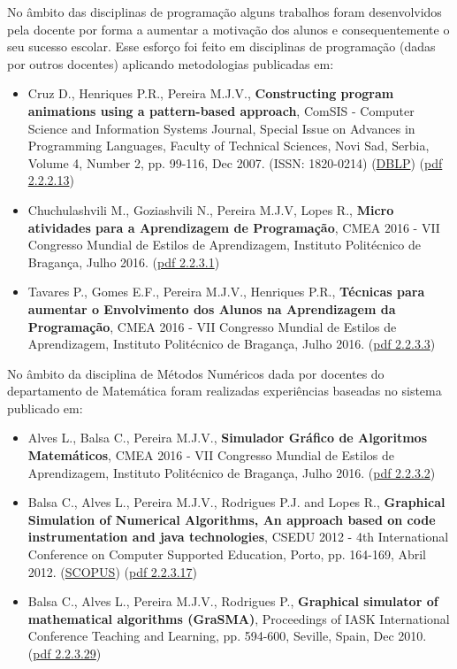 \documentclass[11pt]{article}
\begin{document}
No âmbito das disciplinas de programação alguns trabalhos foram desenvolvidos pela docente por forma a aumentar a motivação dos alunos e consequentemente o seu sucesso escolar. Esse esforço foi feito em disciplinas de programação (dadas por outros docentes) aplicando metodologias publicadas em:
\begin{itemize}
\item {Cruz D., Henriques P.R., Pereira M.J.V., {\bf{ Constructing program animations using a pattern-based approach}}, ComSIS - Computer Science and Information Systems Journal, Special Issue on Advances in Programming Languages, Faculty of Technical Sciences, Novi Sad, Serbia, Volume 4, Number 2, pp. 99-116, Dec 2007. (ISSN: 1820-0214) (\href{run:Publicacoes/ComprovativosDBLP.pdf}{DBLP}) (\href{run:Publicacoes/publicacoes/25.pdf}{pdf 2.2.2.13})}
\item {Chuchulashvili M., Goziashvili N., Pereira M.J.V, Lopes R., {\bf{ Micro atividades para a Aprendizagem de Programação}}, CMEA 2016 - VII Congresso Mundial de Estilos de Aprendizagem, Instituto Politécnico de Bragança, Julho 2016. (\href{run:Publicacoes/publicacoes/91.pdf}{pdf 2.2.3.1})}
\item {Tavares P., Gomes E.F., Pereira M.J.V., Henriques P.R., {\bf{ Técnicas para aumentar o Envolvimento dos Alunos na Aprendizagem da Programação}}, CMEA 2016 - VII Congresso Mundial de Estilos de Aprendizagem, Instituto Politécnico de Bragança, Julho 2016. (\href{run:Publicacoes/publicacoes/89.pdf}{pdf 2.2.3.3})}
\end{itemize}
No âmbito da disciplina de Métodos Numéricos dada por docentes do departamento de Matemática foram realizadas experiências baseadas no sistema publicado em:
\begin{itemize}
\item {Alves L., Balsa C., Pereira M.J.V., {\bf{ Simulador Gráfico de Algoritmos Matemáticos}}, CMEA 2016 - VII Congresso Mundial de Estilos de Aprendizagem, Instituto Politécnico de Bragança, Julho 2016. (\href{run:Publicacoes/publicacoes/90.pdf}{pdf 2.2.3.2})}
\item {Balsa C., Alves L., Pereira M.J.V., Rodrigues P.J. and Lopes R., {\bf{ Graphical Simulation of Numerical Algorithms, An approach based on code instrumentation and java technologies}}, CSEDU 2012 - 4th International Conference on Computer Supported Education, Porto, pp. 164-169, Abril 2012. (\href{run:Publicacoes/PublicacoesSCOPUS.pdf}{SCOPUS}) (\href{run:Publicacoes/publicacoes/66.pdf}{pdf 2.2.3.17})}
\item {Balsa C., Alves L., Pereira M.J.V., Rodrigues P., {\bf{ Graphical simulator of mathematical algorithms (GraSMA)}}, Proceedings of IASK International Conference Teaching and Learning, pp. 594-600, Seville, Spain, Dec 2010. (\href{run:Publicacoes/publicacoes/84.pdf}{pdf 2.2.3.29})}
\end{itemize}
\end{document}
